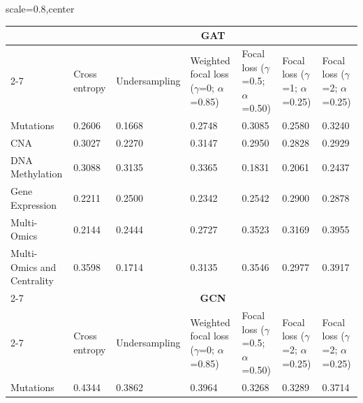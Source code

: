 \documentclass[ppgc, diss, english]{iiufrgs}
\begin{document}
\begin{landscape}
\begin{table}[!th]
\begin{adjustbox}{scale=0.8,center}
\begin{tabular}{lllllll}
\hline
                           & \multicolumn{6}{c}{\textbf{GAT}}                                                                                                                              \\ \cline{2-7} 
                           & Cross entropy & Undersampling & Weighted focal loss ($\gamma$=0; $\alpha$=0.85) & Focal loss ($\gamma$=0.5; $\alpha$=0.50) & Focal loss ($\gamma$=1; $\alpha$=0.25) & Focal loss ($\gamma$=2; $\alpha$=0.25) \\
Mutations                  & 0.2606        & 0.1668        & 0.2748                            & 0.3085                     & 0.2580                   & 0.3240                   \\
CNA                        & 0.3027        & 0.2270        & 0.3147                            & 0.2950                     & 0.2828                   & 0.2929                   \\
DNA Methylation            & 0.3088        & 0.3135        & 0.3365                            & 0.1831                     & 0.2061                   & 0.2437                   \\
Gene Expression            & 0.2211        & 0.2500        & 0.2342                            & 0.2542                     & 0.2900                   & 0.2878                   \\
Multi-Omics                & 0.2144        & 0.2444        & 0.2727                            & 0.3523                     & 0.3169                   & 0.3955                   \\
Multi-Omics and Centrality & 0.3598        & 0.1714        & 0.3135                            & 0.3546                     & 0.2977                   & 0.3917                   \\ \cline{2-7}
                           & \multicolumn{6}{c}{\textbf{GCN}}                                                                                                                              \\ \cline{2-7}
                           & Cross entropy & Undersampling & Weighted focal loss ($\gamma$=0; $\alpha$=0.85) & Focal loss ($\gamma$=0.5; $\alpha$=0.50) & Focal loss ($\gamma$=2; $\alpha$=0.25) & Focal loss ($\gamma$=2; $\alpha$=0.25) \\
Mutations                  & 0.4344        & 0.3862        & 0.3964                            & 0.3268                     & 0.3289                   & 0.3714                   \\

\end{tabular}
\end{adjustbox}
\end{table}
\end{landscape}
\end{document}
